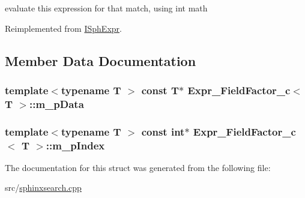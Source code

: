 evaluate this expression for that match, using int math 



Reimplemented from \hyperlink{structISphExpr_a32fb4380bed5d788ce29c0c659b2e917}{I\-Sph\-Expr}.



\subsection{Member Data Documentation}
\hypertarget{structExpr__FieldFactor__c_ab8a2a4f48d8b7b313288eb67ad2170ec}{
\subsubsection[{m\-\_\-p\-Data}]{\setlength{\rightskip}{0pt plus 5cm}template$<$typename T $>$ const T$\ast$ {\bf Expr\-\_\-\-Field\-Factor\-\_\-c}$<$ T $>$\-::m\-\_\-p\-Data}}\label{structExpr__FieldFactor__c_ab8a2a4f48d8b7b313288eb67ad2170ec}
\hypertarget{structExpr__FieldFactor__c_af43b72a2e95943784565048c23d1b32c}{
\subsubsection[{m\-\_\-p\-Index}]{\setlength{\rightskip}{0pt plus 5cm}template$<$typename T $>$ const {\bf int}$\ast$ {\bf Expr\-\_\-\-Field\-Factor\-\_\-c}$<$ T $>$\-::m\-\_\-p\-Index}}\label{structExpr__FieldFactor__c_af43b72a2e95943784565048c23d1b32c}


The documentation for this struct was generated from the following file\-:\begin{DoxyCompactItemize}
\item 
src/\hyperlink{sphinxsearch_8cpp}{sphinxsearch.\-cpp}\end{DoxyCompactItemize}
